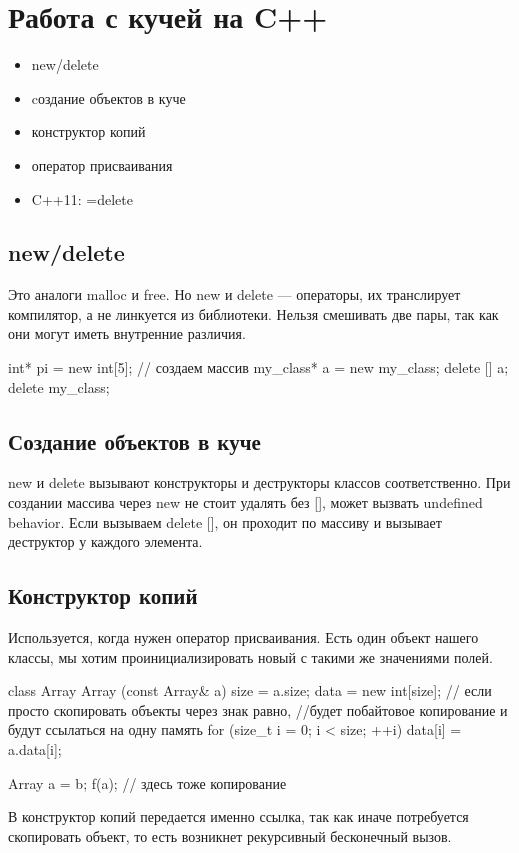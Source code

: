 \section{Работа с кучей на C++}
\begin{itemize}[noitemsep]
    \item new/delete
    \item cоздание объектов в куче
    \item конструктор копий
    \item оператор присваивания
    \item C++11: =delete
\end{itemize}
\subsection{new/delete}
Это аналоги malloc и free. Но new и delete --- операторы, их транслирует компилятор, а не линкуется из библиотеки.
Нельзя смешивать две пары, так как они могут иметь внутренние различия.
\begin{ccode}
int* pi = new int[5]; // создаем массив
my_class* a = new my_class;
delete [] a;
delete my_class;
\end{ccode}
\subsection{Создание объектов в куче}
new и delete вызывают конструкторы и деструкторы классов соответственно. При создании массива через new не стоит удалять без [], может вызвать undefined behavior. Если вызываем delete [], он проходит по массиву и вызывает деструктор у каждого элемента.
\subsection{Конструктор копий}
Используется, когда нужен оператор присваивания. Есть один объект нашего классы, мы хотим проинициализировать новый с такими же значениями полей.
\begin{ccode}
class Array {
    Array (const Array& a) {
	size = a.size;
	data = new int[size];
	// если просто скопировать объекты через знак равно,
	//будет побайтовое копирование и будут ссылаться на одну память
	for (size_t i = 0; i < size; ++i) 
	    data[i] = a.data[i];
    }
}

Array a = b;
f(a); // здесь тоже копирование
\end{ccode}
В конструктор копий передается именно ссылка, так как иначе потребуется скопировать объект, то есть возникнет рекурсивный бесконечный вызов.
